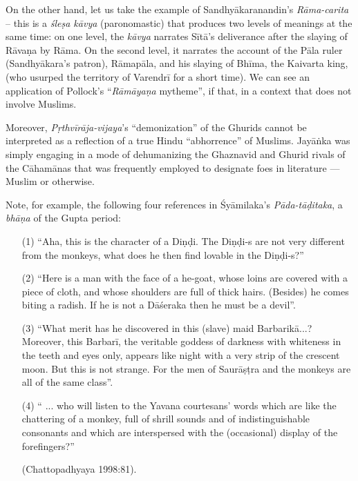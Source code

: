 On the other hand, let us take the example of Sandhyākaranandin's {\sl Rāma-carita} – this is a {\sl śleṣa kāvya} (paronomastic) that produces two levels of meanings at the same time: on one level, the {\sl kāvya} narrates Sītā’s deliverance after the slaying of Rāvaṇa by Rāma.  On the second level, it narrates the account of the Pāla ruler (Sandhyākara’s patron), Rāmapāla, and his slaying of Bhīma, the Kaivarta king, (who usurped the territory of Varendrī for a short time). We can see an application of Pollock’s “{\sl Rāmāyaṇa} mytheme”, if that, in a context that does not involve Muslims. 

Moreover, {\sl Pṛthvīrāja-vijaya}’s “demonization” of the Ghurids cannot be interpreted as a reflection of a true Hindu “abhorrence” of Muslims. Jayāṅka was simply engaging in a mode of dehumanizing the Ghaznavid and Ghurid rivals of the Cāhamānas that was frequently employed to designate foes in literature — Muslim or otherwise. 

Note, for example, the following four references in Śyāmilaka’s {\sl Pāda-tāḍitaka}, a {\sl bhāṇa} of the Gupta period: 
\begin{itemize}
\item[(1)] “Aha, this is the character of a Diṇḍi. The Diṇḍi-s are not very different from the monkeys, what does he then find lovable in the Diṇḍi-s?”

\item[(2)] “Here is a man with the face of a he-goat, whose loins are covered with a piece of cloth, and whose shoulders are full of thick hairs. (Besides) he comes biting a radish. If he is not a Dāśeraka then he must be a devil”. 

\item[(3)] “What merit has he discovered in this (slave) maid Barbarikā...? Moreover, this Barbarī, the veritable goddess of darkness with whiteness in the teeth and eyes only, appears like night with a very strip of the crescent moon. But this is not strange. For the men of Saurāṣṭra and the monkeys are all of the same class”. 

\item[(4)] “ ... who will listen to the Yavana courtesans’ words which are like the chattering of a monkey, full of shrill sounds and of indistinguishable consonants and which are interspersed with the (occasional) display of the forefingers?” 

\hfill (Chattopadhyaya 1998:81). 
\end{itemize}

